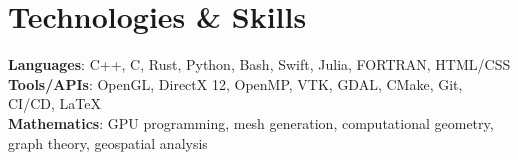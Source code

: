 \section{Technologies \& Skills}
 \begin{itemize}[leftmargin=0.15in, label={}]
    \small{\item{
     \textbf{Languages}{: C++, C, Rust, Python, Bash, Swift, Julia, FORTRAN, HTML/CSS} \\
     \textbf{Tools/APIs}{: OpenGL, DirectX 12, OpenMP, VTK, GDAL, CMake, Git, CI/CD, \LaTeX} \\
     \textbf{Mathematics}{: GPU programming, mesh generation, computational geometry, graph theory, geospatial analysis}
    }}
 \end{itemize}
